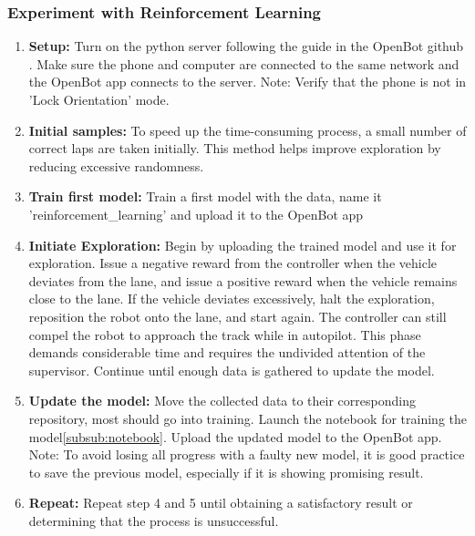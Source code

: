 \documentclass[12pt]{report}
\begin{document}
\subsubsection{Experiment with Reinforcement Learning}
\begin{enumerate}
    \item \textbf{Setup: } Turn on the python server following the guide in the OpenBot github \cite{bib:git_openbot}. Make sure the phone and computer are connected to the same network and the OpenBot app connects to the server. Note: Verify that the phone is not in 'Lock Orientation' mode.
    \item \textbf{Initial samples: } To speed up the time-consuming process, a small number of correct laps are taken initially. This method helps improve exploration by reducing excessive randomness.
    \item \textbf{Train first model: } Train a first model with the data, name it 'reinforcement\_learning' and upload it to the OpenBot app
    \item \textbf{Initiate Exploration: } Begin by uploading the trained model and use it for exploration. Issue a negative reward from the controller when the vehicle deviates from the lane, and issue a positive reward when the vehicle remains close to the lane. If the vehicle deviates excessively, halt the exploration, reposition the robot onto the lane, and start again. The controller can still compel the robot to approach the track while in autopilot. This phase demands considerable time and requires the undivided attention of the supervisor. Continue until enough data is gathered to update the model.
    \item  \textbf{Update the model: } Move the collected data to their corresponding repository, most should go into training. Launch the notebook for training the model\ref{subsub:notebook}. Upload the updated model to the OpenBot app. Note: To avoid losing all progress with a faulty new model, it is good practice to save the previous model, especially if it is showing promising result.
    \item \textbf{Repeat: } Repeat step 4 and 5 until obtaining a satisfactory result or determining that the process is unsuccessful.
    
\end{enumerate}
\end{document}
